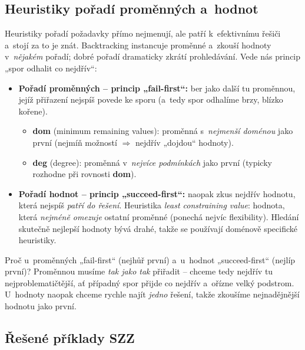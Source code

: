 \subsection{Heuristiky pořadí proměnných a~hodnot}

Heuristiky pořadí požadavky přímo nejmenují, ale patří k~efektivnímu řešiči a~stojí za to je znát. Backtracking instancuje proměnné a~zkouší hodnoty v~\emph{nějakém} pořadí; dobré pořadí dramaticky zkrátí prohledávání. Vede nás princip „spor odhalit co nejdřív``:
\begin{itemize}
  \item \textbf{Pořadí proměnných -- princip „fail-first``:} ber jako další tu proměnnou, jejíž přiřazení nejspíš povede ke sporu (a~tedy spor odhalíme brzy, blízko kořene).
  \begin{itemize}
    \item \textbf{dom} (minimum remaining values): proměnná s~\emph{nejmenší doménou} jako první (nejmíň možností $\Rightarrow$ nejdřív „dojdou`` hodnoty).
    \item \textbf{deg} (degree): proměnná v~\emph{nejvíce podmínkách} jako první (typicky rozhodne při rovnosti \textbf{dom}).
  \end{itemize}
  \item \textbf{Pořadí hodnot -- princip „succeed-first``:} naopak zkus nejdřív hodnotu, která nejspíš \emph{patří do řešení}. Heuristika \emph{least constraining value}: hodnota, která \emph{nejméně omezuje} ostatní proměnné (ponechá nejvíc flexibility). Hledání skutečně nejlepší hodnoty bývá drahé, takže se používají doménově specifické heuristiky.
\end{itemize}

\begin{intuice}
Proč u~proměnných „fail-first`` (nejhůř první) a~u~hodnot „succeed-first`` (nejlíp první)? Proměnnou musíme \emph{tak jako tak} přiřadit -- chceme tedy nejdřív tu nejproblematičtější, ať případný spor přijde co nejdřív a~ořízne velký podstrom. U~hodnoty naopak chceme rychle najít \emph{jedno} řešení, takže zkoušíme nejnadějnější hodnotu jako první.
\end{intuice}

\subsection{Řešené příklady SZZ}

